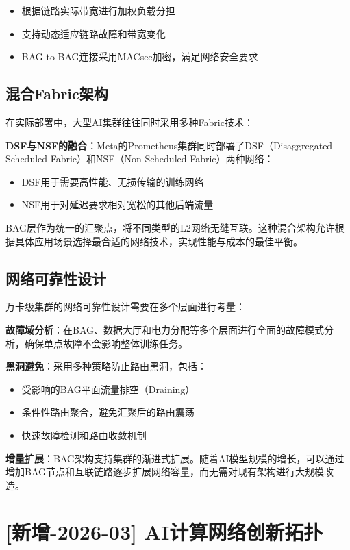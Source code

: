 \begin{itemize}
    \item 根据链路实际带宽进行加权负载分担
    \item 支持动态适应链路故障和带宽变化
    \item BAG-to-BAG连接采用MACsec加密，满足网络安全要求
\end{itemize}

\subsection{混合Fabric架构}

在实际部署中，大型AI集群往往同时采用多种Fabric技术：

\textbf{DSF与NSF的融合}：Meta的Prometheus集群同时部署了DSF（Disaggregated Scheduled Fabric）和NSF（Non-Scheduled Fabric）两种网络：
\begin{itemize}
    \item DSF用于需要高性能、无损传输的训练网络
    \item NSF用于对延迟要求相对宽松的其他后端流量
\end{itemize}

BAG层作为统一的汇聚点，将不同类型的L2网络无缝互联。这种混合架构允许根据具体应用场景选择最合适的网络技术，实现性能与成本的最佳平衡。

\subsection{网络可靠性设计}

万卡级集群的网络可靠性设计需要在多个层面进行考量：

\textbf{故障域分析}：在BAG、数据大厅和电力分配等多个层面进行全面的故障模式分析，确保单点故障不会影响整体训练任务。

\textbf{黑洞避免}：采用多种策略防止路由黑洞，包括：
\begin{itemize}
    \item 受影响的BAG平面流量排空（Draining）
    \item 条件性路由聚合，避免汇聚后的路由震荡
    \item 快速故障检测和路由收敛机制
\end{itemize}

\textbf{增量扩展}：BAG架构支持集群的渐进式扩展。随着AI模型规模的增长，可以通过增加BAG节点和互联链路逐步扩展网络容量，而无需对现有架构进行大规模改造。

\section{[新增-2026-03] AI计算网络创新拓扑}

